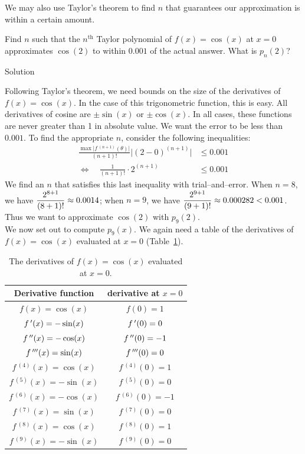 We may also use Taylor's theorem to find $n$ that guarantees our approximation is within a certain amount.

\begin{example}\label{ex_taypoly4}
Find $n$ such that the $n^\text{th}$ Taylor polynomial of $f(x)=\cos(x)$ at $x=0$ approximates $\cos(2)$ to within $0.001$ of the actual answer. What is $p_n(2)$?

Solution 

Following Taylor's theorem, we need bounds on the size of the derivatives of $f(x)=\cos(x)$. In the case of this trigonometric function, this is easy. All derivatives of cosine are $\pm \sin(x)$ or $\pm \cos(x)$. In all cases, these functions are never greater than 1 in absolute value. We want the error to be less than $0.001$. To find the appropriate $n$, consider the following inequalities:
\begin{align*}
\frac{\max\big|f\,^{(n+1)}(\theta)\big|}{(n+1)!}\big|(2-0)^{(n+1)}\big| &\leq 0.001 \\
\Leftrightarrow\quad\frac1{(n+1)!}\cdot2^{(n+1)} &\leq 0.001
\end{align*}
We find an $n$ that satisfies this last inequality with trial--and--error. When $n=8$, we have $\displaystyle \frac{2^{8+1}}{(8+1)!} \approx 0.0014$; when $n=9$, we have $\displaystyle \frac{2^{9+1}}{(9+1)!} \approx 0.000282 <0.001$. Thus we want to approximate $\cos(2)$ with $p_9(2)$.\\

We now set out to compute $p_9(x)$. We again need a table of the derivatives of $f(x)=\cos(x)$ evaluated at $x=0$ (Table~\ref{tab_series_2}).

\begin{table}[H]
\caption{The derivatives of $f(x)=\cos(x)$ evaluated at $x=0$.}
\label{tab_series_2}
\renewcommand{\arraystretch}{1.5}
\begin{tabular}{c|c}
Derivative function&derivative at $x=0$\\\hline
$f(x) = \cos (x) $&$f(0) = 1$\\
$f\,'(x) = -\sin (x) $&$f\,'(0) = 0$\\
$f\,''(x) = -\cos (x) $&$f\,''(0) = -1$\\
$f\,'''(x) = \sin (x) $&$f\,'''(0) = 0$\\
$f\,^{(4)}(x) = \cos (x) $&$f\,^{(4)}(0) = 1$\\
$f\,^{(5)}(x) = -\sin (x) $&$f\,^{(5)}(0) = 0$\\
$f\,^{(6)}(x) = -\cos (x) $&$f\,^{(6)}(0) = -1$\\
$f\,^{(7)}(x) = \sin (x) $&$f\,^{(7)}(0) = 0$\\
$f\,^{(8)}(x) = \cos (x) $&$f\,^{(8)}(0) = 1$\\
$f\,^{(9)}(x) = -\sin (x) $&$f\,^{(9)}(0) = 0$\\
\end{tabular}
\renewcommand{\arraystretch}{1}
\end{table}



\end{example}
